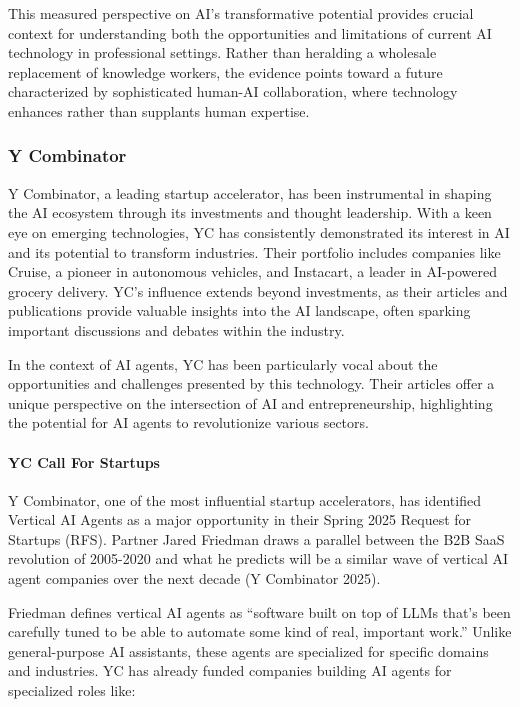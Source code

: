 \documentclass[
]{article}
\begin{document}
This measured perspective on AI's transformative potential provides
crucial context for understanding both the opportunities and limitations
of current AI technology in professional settings. Rather than heralding
a wholesale replacement of knowledge workers, the evidence points toward
a future characterized by sophisticated human-AI collaboration, where
technology enhances rather than supplants human expertise.

\subsubsection{Y Combinator}\label{y-combinator}

Y Combinator, a leading startup accelerator, has been instrumental in
shaping the AI ecosystem through its investments and thought leadership.
With a keen eye on emerging technologies, YC has consistently
demonstrated its interest in AI and its potential to transform
industries. Their portfolio includes companies like Cruise, a pioneer in
autonomous vehicles, and Instacart, a leader in AI-powered grocery
delivery. YC's influence extends beyond investments, as their articles
and publications provide valuable insights into the AI landscape, often
sparking important discussions and debates within the industry.

In the context of AI agents, YC has been particularly vocal about the
opportunities and challenges presented by this technology. Their
articles offer a unique perspective on the intersection of AI and
entrepreneurship, highlighting the potential for AI agents to
revolutionize various sectors.

\paragraph{YC Call For Startups}\label{yc-call-for-startups}

Y Combinator, one of the most influential startup accelerators, has
identified Vertical AI Agents as a major opportunity in their Spring
2025 Request for Startups (RFS). Partner Jared Friedman draws a parallel
between the B2B SaaS revolution of 2005-2020 and what he predicts will
be a similar wave of vertical AI agent companies over the next decade (Y
Combinator 2025).

Friedman defines vertical AI agents as ``software built on top of LLMs
that's been carefully tuned to be able to automate some kind of real,
important work.'' Unlike general-purpose AI assistants, these agents are
specialized for specific domains and industries. YC has already funded
companies building AI agents for specialized roles like:
\end{document}
